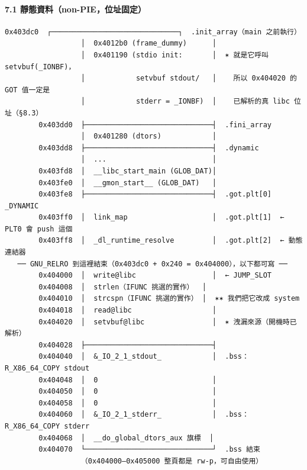 \documentclass[10pt,a4paper]{article}
\begin{document}
\paragraph{7.1
靜態資料（non-PIE，位址固定）}\label{ux975cux614bux8cc7ux6599non-pieux4f4dux5740ux56faux5b9a}

\begin{Verbatim}[breaklines=true,breakanywhere=true,breakautoindent=false,fontsize=\fontsize{7.0}{9.5}\selectfont]
        0x403dc0  ┌──────────────────────────────┐  .init_array（main 之前執行）
                  │  0x4012b0 (frame_dummy)      │
                  │  0x401190 (stdio init:       │  ✶ 就是它呼叫 setvbuf(_IONBF)，
                  │            setvbuf stdout/   │    所以 0x404020 的 GOT 值一定是
                  │            stderr = _IONBF)  │    已解析的真 libc 位址（§8.3）
        0x403dd0  ├──────────────────────────────┤  .fini_array
                  │  0x401280 (dtors)            │
        0x403dd8  ├──────────────────────────────┤  .dynamic
                  │  ...                         │
        0x403fd8  │  __libc_start_main (GLOB_DAT)│
        0x403fe0  │  __gmon_start__ (GLOB_DAT)   │
        0x403fe8  ├──────────────────────────────┤  .got.plt[0] _DYNAMIC
        0x403ff0  │  link_map                    │  .got.plt[1]  ← PLT0 會 push 這個
        0x403ff8  │  _dl_runtime_resolve         │  .got.plt[2]  ← 動態連結器
   ── GNU_RELRO 到這裡結束（0x403dc0 + 0x240 = 0x404000），以下都可寫 ──
        0x404000  │  write@libc                  │  ← JUMP_SLOT
        0x404008  │  strlen（IFUNC 挑選的實作）  │
        0x404010  │  strcspn（IFUNC 挑選的實作） │  ✶✶ 我們把它改成 system
        0x404018  │  read@libc                   │
        0x404020  │  setvbuf@libc                │  ✶ 洩漏來源（開機時已解析）
        0x404028  ├──────────────────────────────┤
        0x404040  │  &_IO_2_1_stdout_            │  .bss：R_X86_64_COPY stdout
        0x404048  │  0                           │
        0x404050  │  0                           │
        0x404058  │  0                           │
        0x404060  │  &_IO_2_1_stderr_            │  .bss：R_X86_64_COPY stderr
        0x404068  │  __do_global_dtors_aux 旗標  │
        0x404070  └──────────────────────────────┘  .bss 結束
                  （0x404000–0x405000 整頁都是 rw-p，可自由使用）
\end{Verbatim}
\end{document}
